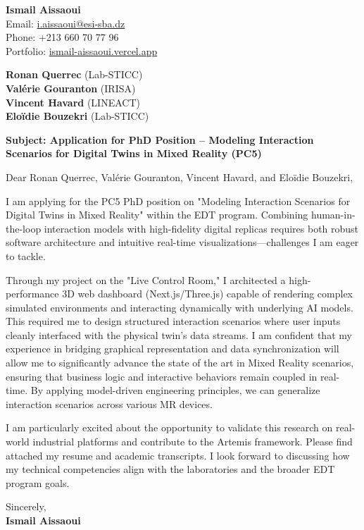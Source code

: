 \documentclass[11pt,a4paper]{article}
\begin{document}
\thispagestyle{empty}

\begin{flushright}
\textbf{Ismail Aissaoui} \\
Email: \href{mailto:i.aissaoui@esi-sba.dz}{i.aissaoui@esi-sba.dz} \\
Phone: +213 660 70 77 96 \\
Portfolio: \href{https://ismail-aissaoui.vercel.app}{ismail-aissaoui.vercel.app}
\end{flushright}

\vspace{1em}

\begin{flushleft}
\textbf{Ronan Querrec} (Lab-STICC) \\
\textbf{Valérie Gouranton} (IRISA) \\
\textbf{Vincent Havard} (LINEACT) \\
\textbf{Eloïdie Bouzekri} (Lab-STICC)
\end{flushleft}

\vspace{1em}
\noindent\textbf{Subject: Application for PhD Position -- Modeling Interaction Scenarios for Digital Twins in Mixed Reality (PC5)}
\vspace{1em}

\noindent Dear Ronan Querrec, Valérie Gouranton, Vincent Havard, and Eloïdie Bouzekri,

\vspace{1em}
\noindent
I am applying for the PC5 PhD position on "Modeling Interaction Scenarios for Digital Twins in Mixed Reality" within the EDT program. Combining human-in-the-loop interaction models with high-fidelity digital replicas requires both robust software architecture and intuitive real-time visualizations---challenges I am eager to tackle.

\vspace{0.5em}
\noindent
Through my project on the "Live Control Room," I architected a high-performance 3D web dashboard (Next.js/Three.js) capable of rendering complex simulated environments and interacting dynamically with underlying AI models. This required me to design structured interaction scenarios where user inputs cleanly interfaced with the physical twin's data streams. I am confident that my experience in bridging graphical representation and data synchronization will allow me to significantly advance the state of the art in Mixed Reality scenarios, ensuring that business logic and interactive behaviors remain coupled in real-time. By applying model-driven engineering principles, we can generalize interaction scenarios across various MR devices.

\vspace{0.5em}
\noindent
I am particularly excited about the opportunity to validate this research on real-world industrial platforms and contribute to the Artemis framework. Please find attached my resume and academic transcripts. I look forward to discussing how my technical competencies align with the laboratories and the broader EDT program goals.

\vspace{1.5em}
\noindent
Sincerely, \\[0.5em]
\textbf{Ismail Aissaoui}
\end{document}
